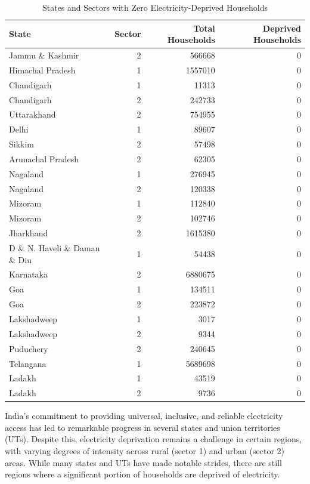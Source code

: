 \documentclass{article}
\begin{document}
\begin{table}[htbp]
	\centering
	\small
	\caption{States and Sectors with Zero Electricity-Deprived Households}
	\begin{tabular}{lrrr}
		\toprule
		State & Sector & Total Households & Deprived Households \\
		\midrule
		Jammu \& Kashmir & 2 & 566668 & 0 \\
		Himachal Pradesh & 1 & 1557010 & 0 \\
		Chandigarh & 1 & 11313 & 0 \\
		Chandigarh & 2 & 242733 & 0 \\
		Uttarakhand & 2 & 754955 & 0 \\
		Delhi & 1 & 89607 & 0 \\
		Sikkim & 2 & 57498 & 0 \\
		Arunachal Pradesh & 2 & 62305 & 0 \\
		Nagaland & 1 & 276945 & 0 \\
		Nagaland & 2 & 120338 & 0 \\
		Mizoram & 1 & 112840 & 0 \\
		Mizoram & 2 & 102746 & 0 \\
		Jharkhand & 2 & 1615380 & 0 \\
		D \& N. Haveli \& Daman \& Diu & 1 & 54438 & 0 \\
		Karnataka & 2 & 6880675 & 0 \\
		Goa & 1 & 134511 & 0 \\
		Goa & 2 & 223872 & 0 \\
		Lakshadweep & 1 & 3017 & 0 \\
		Lakshadweep & 2 & 9344 & 0 \\
		Puduchery & 2 & 240645 & 0 \\
		Telangana & 1 & 5689698 & 0 \\
		Ladakh & 1 & 43519 & 0 \\
		Ladakh & 2 & 9736 & 0 \\
		\bottomrule
	\end{tabular}
\end{table}




India’s commitment to providing universal, inclusive, and reliable electricity access has led to remarkable progress in several states and union territories (UTs). Despite this, electricity deprivation remains a challenge in certain regions, with varying degrees of intensity across rural (sector 1) and urban (sector 2) areas. While many states and UTs have made notable strides, there are still regions where a significant portion of households are deprived of electricity.
\end{document}
